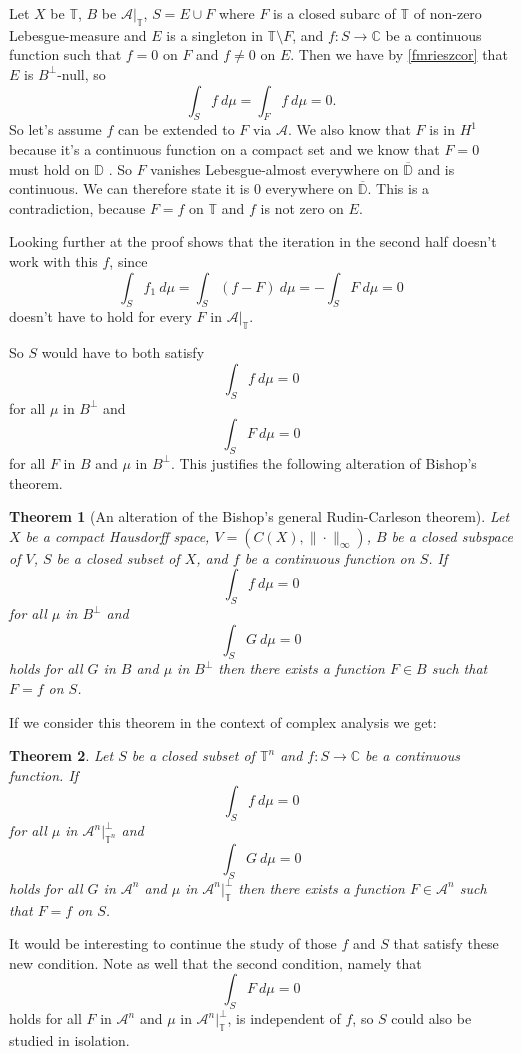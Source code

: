 \documentclass[a4paper,12pt,twoside,BCOR=10mm]{scrbook}
\newtheorem{theorem}{Theorem}[section]
\theoremstyle{definition}
\theoremstyle{definition}
\theoremstyle{definition}
\begin{document}
Let
	$X$ be $\mathbb{T}$,
	$B$ be $\mathcal{A}|_{\mathbb{T}}$,
	$S = E \cup F$ where $F$ is a closed subarc of $\mathbb{T}$ of non-zero Lebesgue-measure and $E$ is a singleton in $\mathbb{T} \setminus F$,
	and $f: S \rightarrow \mathbb{C}$ be a continuous function such that $f = 0$ on $F$ and $f \neq 0$ on $E$.
Then we have by \ref{fmrieszcor} that $E$ is $B^{\bot}$-null, so
\[
	\int_S f\ d\mu = \int_F f\ d\mu = 0.
\]
So let's assume $f$ can be extended to $F$ via $\mathcal{A}$.
We also know that $F$ is in $H^1$ because it's a continuous function on a compact set and we know that $F = 0$ must hold on $\mathbb{D}$
\citep[Theorem $13.4.11$]{greenkrantz}.
So $F$ vanishes Lebesgue-almost everywhere on $\overline{\mathbb{D}}$ and is continuous.
We can therefore state it is $0$ everywhere on $\overline{\mathbb{D}}$.
This is a contradiction, because $F = f$ on $\mathbb{T}$ and $f$ is not zero on $E$.

Looking further at the proof shows that the iteration in the second half doesn't work with this $f$, since 
\[
	\int_S f_1\ d\mu = \int_S (f - F)\ d\mu = -\int_S F\ d\mu = 0
\]
doesn't have to hold for every $F$ in $\mathcal{A}|_{\mathbb{T}}$.

So $S$ would have to both satisfy
\[
	\int_S f\ d\mu = 0
\]
for all $\mu$ in $B^{\bot}$ and
\[
	\int_S F\ d\mu = 0
\]
for all $F$ in $B$ and $\mu$ in $B^{\bot}$.
This justifies the following alteration of Bishop's theorem.
\begin{theorem}[An alteration of the Bishop's general Rudin-Carleson theorem]
Let $X$ be a compact Hausdorff space,
	$V = (C(X), \| \cdot \|_{\infty})$,
	$B$ be a closed subspace of $V$,
	$S$ be a closed subset of $X$,
	and $f$ be a continuous function on $S$.
If
\[
	\int_S f\ d\mu = 0
\]
for all $\mu$ in $B^{\bot}$ and
\[
	\int_S G\ d\mu = 0
\]
holds for all $G$ in $B$ and $\mu$ in $B^{\bot}$ then there exists a function $F \in B$ such that $F = f$ on $S$.
\end{theorem}
If we consider this theorem in the context of complex analysis we get:
\begin{theorem}
Let $S$ be a closed subset of $\mathbb{T}^n$ and $f: S \rightarrow \mathbb{C}$ be a continuous function.
If
\[
	\int_S f\ d\mu = 0
\]
for all $\mu$ in $\mathcal{A}^n|_{\mathbb{T}^n}^{\bot}$ and
\[
	\int_S G\ d\mu = 0
\]
holds for all $G$ in $\mathcal{A}^n$ and $\mu$ in $\mathcal{A}^n|_{\mathbb{T}}^{\bot}$ then there exists a function $F \in \mathcal{A}^n$ such that $F = f$ on $S$.
\end{theorem}
It would be interesting to continue the study of those $f$ and $S$ that satisfy these new condition.
Note as well that the second condition, namely that
\[
	\int_S F\ d\mu = 0
\]
holds for all $F$ in $\mathcal{A}^n$ and $\mu$ in $\mathcal{A}^n|_{\mathbb{T}}^{\bot}$, is independent of $f$, so $S$ could also be studied in isolation.
\end{document}
